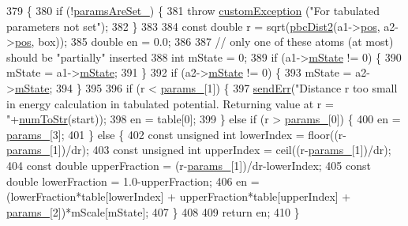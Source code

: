 \begin{DoxyCode}
379                                                                                          \{
380     \textcolor{keywordflow}{if} (!\hyperlink{classpair_potential_a635755c0a952bfc05a4cfae230c3dbd2}{paramsAreSet\_}) \{
381         \textcolor{keywordflow}{throw} \hyperlink{classcustom_exception}{customException} (\textcolor{stringliteral}{"For tabulated parameters not set"});
382     \}
383 
384     \textcolor{keyword}{const} \textcolor{keywordtype}{double} r = sqrt(\hyperlink{utilities_8cpp_abb1db3a8a3ac46e044bbe7b2c5684c0a}{pbcDist2}(a1->\hyperlink{classatom_a3ae5f4880e7831d8b2c9fda72b4eb24a}{pos}, a2->\hyperlink{classatom_a3ae5f4880e7831d8b2c9fda72b4eb24a}{pos}, box));
385     \textcolor{keywordtype}{double} en = 0.0;
386 
387     \textcolor{comment}{// only one of these atoms (at most) should be "partially" inserted}
388     \textcolor{keywordtype}{int} mState = 0;
389     \textcolor{keywordflow}{if} (a1->\hyperlink{classatom_a3cb00c0c5b7533657e05af6ff4a42740}{mState} != 0) \{
390         mState = a1->\hyperlink{classatom_a3cb00c0c5b7533657e05af6ff4a42740}{mState};
391     \}
392     \textcolor{keywordflow}{if} (a2->\hyperlink{classatom_a3cb00c0c5b7533657e05af6ff4a42740}{mState} != 0) \{
393         mState = a2->\hyperlink{classatom_a3cb00c0c5b7533657e05af6ff4a42740}{mState};
394     \}
395 
396     \textcolor{keywordflow}{if} (r < \hyperlink{classpair_potential_abf8ec8af983d6e9960bd149da099e883}{params\_}[1]) \{
397         \hyperlink{utilities_8cpp_a6dacf3c3c19aa1e13a4d5a148fe5114e}{sendErr}(\textcolor{stringliteral}{"Distance r too small in energy calculation in tabulated potential. Returning value
       at r = "}+\hyperlink{utilities_8h_ae6ed8fadf719af789711a7c0e99f44bc}{numToStr}(start));
398         en = table[0];
399     \} \textcolor{keywordflow}{else} \textcolor{keywordflow}{if} (r > \hyperlink{classpair_potential_abf8ec8af983d6e9960bd149da099e883}{params\_}[0]) \{
400         en = \hyperlink{classpair_potential_abf8ec8af983d6e9960bd149da099e883}{params\_}[3];
401     \} \textcolor{keywordflow}{else} \{
402         \textcolor{keyword}{const} \textcolor{keywordtype}{unsigned} \textcolor{keywordtype}{int} lowerIndex = floor((r-\hyperlink{classpair_potential_abf8ec8af983d6e9960bd149da099e883}{params\_}[1])/dr);
403         \textcolor{keyword}{const} \textcolor{keywordtype}{unsigned} \textcolor{keywordtype}{int} upperIndex = ceil((r-\hyperlink{classpair_potential_abf8ec8af983d6e9960bd149da099e883}{params\_}[1])/dr);
404         \textcolor{keyword}{const} \textcolor{keywordtype}{double} upperFraction = (r-\hyperlink{classpair_potential_abf8ec8af983d6e9960bd149da099e883}{params\_}[1])/dr-lowerIndex;
405         \textcolor{keyword}{const} \textcolor{keywordtype}{double} lowerFraction = 1.0-upperFraction;
406         en = (lowerFraction*table[lowerIndex] + upperFraction*table[upperIndex] + 
      \hyperlink{classpair_potential_abf8ec8af983d6e9960bd149da099e883}{params\_}[2])*mScale[mState];
407     \}
408 
409     \textcolor{keywordflow}{return} en;
410 \}
\end{DoxyCode}
